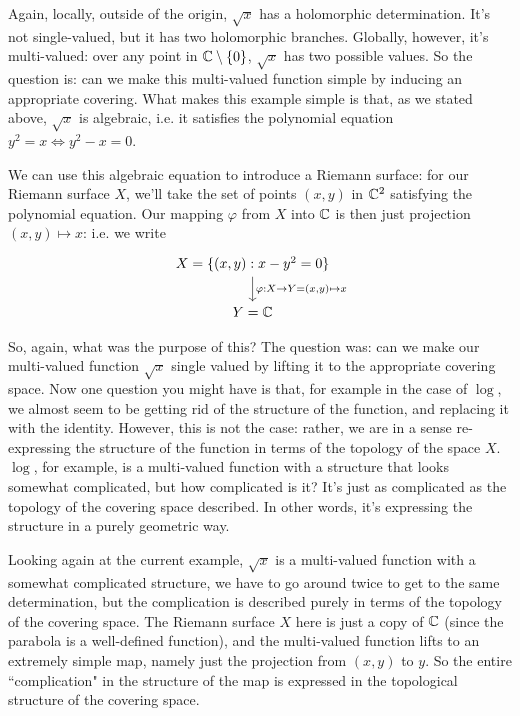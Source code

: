 \documentclass{article}
\begin{document}
\begin{enumerate}
  Again, locally, outside of the origin, \(\sqrt{x}\) has a holomorphic determination. It's not single-valued, but it has two holomorphic branches. Globally, however, it's multi-valued: over any point in \(\mathbb{C}\setminus\{0\}\), \(\sqrt{x}\) has two possible values. So the question is: can we make this multi-valued function simple by inducing an appropriate covering. What makes this example simple is that, as we stated above, \(\sqrt{x}\) is algebraic, i.e. it satisfies the polynomial equation \(y^2 = x \iff y^2 - x = 0\).

  We can use this algebraic equation to introduce a Riemann surface: for our Riemann surface \(X\), we'll take the set of points \((x, y)\) in \(\mathbb{C}^2\) satisfying the polynomial equation. Our mapping \(\varphi\) from \(X\) into \(\mathbb{C}\) is then just projection \((x, y) \mapsto x\): i.e. we write
  \begin{equation}
  \begin{tikzcd}
    X = \{(x, y) : x - y^2 = 0\} \arrow[d, "{\varphi: X \to Y = (x, y) \mapsto x}"] \\ Y = \mbb{C}
  \end{tikzcd}
  \end{equation}

  So, again, what was the purpose of this? The question was: can we make our multi-valued function \(\sqrt{x}\) single valued by lifting it to the appropriate covering space. Now one question you might have is that, for example in the case of \(\log\), we almost seem to be getting rid of the structure of the function, and replacing it with the identity. However, this is not the case: rather, we are in a sense re-expressing the structure of the function in terms of the topology of the space \(X\). \(\log\), for example, is a multi-valued function with a structure that looks somewhat complicated, but how complicated is it? It's just as complicated as the topology of the covering space described. In other words, it's expressing the structure in a purely geometric way.

  Looking again at the current example, \(\sqrt{x}\) is a multi-valued function with a somewhat complicated structure, we have to go around twice to get to the same determination, but the complication is described purely in terms of the topology of the covering space. The Riemann surface \(X\) here is just a copy of \(\mathbb{C}\) (since the parabola is a well-defined function), and the multi-valued function lifts to an extremely simple map, namely just the projection from \((x, y)\) to \(y\). So the entire ``complication" in the structure of the map is expressed in the topological structure of the covering space.


\end{enumerate}
\end{document}
